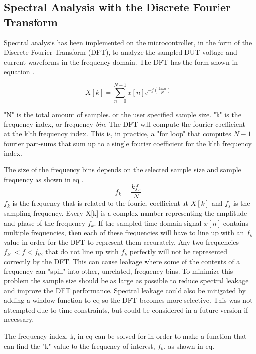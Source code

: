\subsection{Spectral Analysis with the Discrete Fourier Transform} \label{subsec:SpectralAnalysis} 

Spectral analysis has been implemented on the microcontroller, in the form of the Discrete Fourier Transform (DFT), to analyze the sampled DUT voltage and current waveforms in the frequency domain. The DFT has the form shown in equation .

\begin{equation}\label{eq:4_7_2_SA1}
    X[k] = \sum_{n=0}^{N-1} x[n] e^{-j(\frac{2\pi kn}{N})}
\end{equation}

"N" is the total amount of samples, or the user specified sample size. "k" is the frequency index, or frequency \textit{bin}. The DFT will compute the fourier coefficient at the k'th frequency index. This is, in practice, a "for loop" that computes $N-1$ fourier part-sums that sum up to a single fourier coefficient for the k'th frequency index.

The size of the frequency bins depends on the selected sample size and sample frequency as shown in eq .
\begin{equation}\label{eq:4_7_2_SA3}
    f_k = \frac{kf_s}{N} 
\end{equation}
$f_k$ is the frequency that is related to the fourier coefficient at $X[k]$ and $f_s$ is the sampling frequency. Every X[k] is a complex number representing the amplitude and phase of the frequency $f_k$. If the sampled time domain signal $x[n]$ contains multiple frequencies, then each of these frequencies will have to line up with an $f_k$ value in order for the DFT to represent them accurately. Any two frequencies $f_{k1} < f < f_{k2}$ that do not line up with $f_k$ perfectly will not be represented correctly by the DFT. This can cause leakage where some of the contents of a frequency can "spill" into other, unrelated, frequency bins. To minimize this problem the sample size should be as large as possible to reduce spectral leakage and improve the DFT performance. Spectral leakage could also be mitigated by adding a window function to eq  so the DFT becomes more selective. This was not attempted due to time constraints, but could be considered in a future version if necessary.

The frequency index, k, in eq  can be solved for in order to make a function that can find the "k" value to the frequency of interest, $f_k$, as shown in eq.

